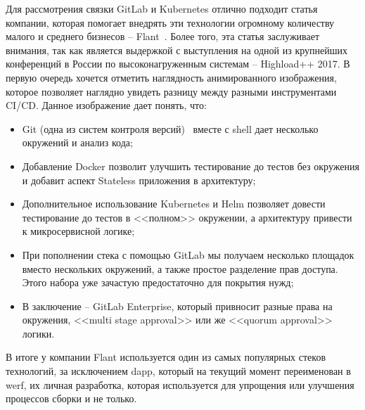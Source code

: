 Для рассмотрения связки GitLab и Kubernetes отлично подходит статья компании, которая помогает внедрять эти технологии огромному количеству малого и среднего бизнесов -- Flant~\cite{habr:flant:k8s-and-gitlab}. Более того, эта статья заслуживает внимания, так как является выдержкой с выступления на одной из крупнейших конференций в России по высоконагруженным системам -- Highload++ 2017. В первую очередь хочется отметить наглядность анимированного изображения, которое позволяет наглядно увидеть разницу между разными инструментами CI/CD.
Данное изображение дает понять, что:
\begin{itemize}
    \item Git (одна из систем контроля версий)~\cite{def:git}
        вместе с shell
        дает несколько окружений и анализ кода;
    \item Добавление Docker позволит улучшить тестирование до тестов без окружения и добавит аспект Stateless
        приложения в архитектуру;
    \item Дополнительное использование Kubernetes и Helm позволяет довести тестирование до тестов в <<полном>> окружении, а архитектуру привести к микросервисной логике;
    \item При пополнении стека с помощью GitLab мы получаем несколько площадок вместо нескольких окружений, а также простое разделение прав доступа. Этого набора уже зачастую предостаточно для покрытия нужд;
    \item В заключение -- GitLab Enterprise, который привносит разные права на окружения, <<multi stage approval>>
        или же <<quorum approval>>
        логики.
\end{itemize}

В итоге у компании Flant используется один из самых популярных стеков технологий, за исключением dapp, который на текущий момент переименован в werf, их личная разработка, которая используется для упрощения или улучшения процессов сборки и не только.

